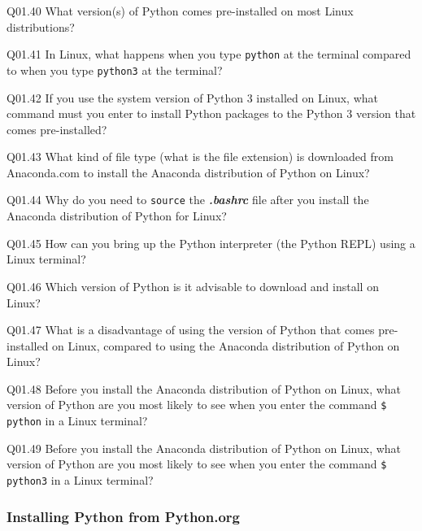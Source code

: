 \documentclass{book}
\newenvironment{problems}{}{}  %
\newcommand{\passthrough}[1]{#1}
\begin{document}
    
        \begin{problems}
        Q01.40 What version(s) of Python comes pre-installed on most Linux
distributions?

Q01.41 In Linux, what happens when you type
\passthrough{\lstinline!python!} at the terminal compared to when you
type \passthrough{\lstinline!python3!} at the terminal?

Q01.42 If you use the system version of Python 3 installed on Linux,
what command must you enter to install Python packages to the Python 3
version that comes pre-installed?

Q01.43 What kind of file type (what is the file extension) is downloaded
from Anaconda.com to install the Anaconda distribution of Python on
Linux?

Q01.44 Why do you need to \passthrough{\lstinline!source!} the
\textbf{\emph{.bashrc}} file after you install the Anaconda distribution
of Python for Linux?

Q01.45 How can you bring up the Python interpreter (the Python REPL)
using a Linux terminal?

Q01.46 Which version of Python is it advisable to download and install
on Linux?

Q01.47 What is a disadvantage of using the version of Python that comes
pre-installed on Linux, compared to using the Anaconda distribution of
Python on Linux?

Q01.48 Before you install the Anaconda distribution of Python on Linux,
what version of Python are you most likely to see when you enter the
command \passthrough{\lstinline!$ python!} in a Linux terminal?

Q01.49 Before you install the Anaconda distribution of Python on Linux,
what version of Python are you most likely to see when you enter the
command \passthrough{\lstinline!$ python3!} in a Linux terminal?
        \end{problems}

    




    
        \hypertarget{installing-python-from-python.org}{%
\subsubsection{Installing Python from
Python.org}\label{installing-python-from-python.org}}
    
\end{document}
